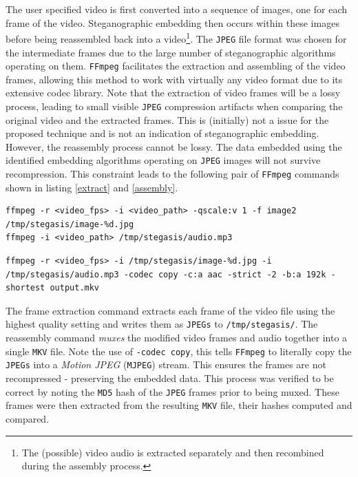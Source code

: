 \documentclass[paper=a4, fontsize=11pt,twoside]{scrartcl}
\numberwithin{table}{section}
\numberwithin{figure}{section}
\numberwithin{algorithm}{section}
\begin{document}
The user specified video is first converted into a sequence of images, one for each frame of the video. Steganographic embedding then occurs within these images before being reassembled back into a video\footnote{The (possible) video audio is extracted separately and then recombined during the assembly process.}. The \texttt{JPEG} file format was chosen for the intermediate frames due to the large number of steganographic algorithms operating on them. \texttt{FFmpeg} facilitates the extraction and assembling of the video frames, allowing this method to work with virtually any video format due to its extensive codec library. Note that the extraction of video frames will be a lossy process, leading to small visible \texttt{JPEG} compression artifacts when comparing the original video and the extracted frames. This is (initially) not a issue for the proposed technique and is not an indication of steganographic embedding. However, the reassembly process cannot be lossy. The data embedded using the identified embedding algorithms operating on \texttt{JPEG} images will not survive recompression. This constraint leads to the following pair of \texttt{FFmpeg} commands shown in listing \ref{extract} and \ref{assembly}.


\begin{lstlisting}[caption={\texttt{FFmpeg} frame extraction command.}, frame=single, label=extract,upquote=true]
ffmpeg -r <video_fps> -i <video_path> -qscale:v 1 -f image2 /tmp/stegasis/image-%d.jpg
ffmpeg -i <video_path> /tmp/stegasis/audio.mp3
\end{lstlisting}

\begin{lstlisting}[caption={\texttt{FFmpeg} video reassembly command.}, frame=single, label=assembly,upquote=true]
ffmpeg -r <video_fps> -i /tmp/stegasis/image-%d.jpg -i /tmp/stegasis/audio.mp3 -codec copy -c:a aac -strict -2 -b:a 192k -shortest output.mkv
\end{lstlisting}

The frame extraction command extracts each frame of the video file using the highest quality setting and writes them as \texttt{JPEGs} to \texttt{/tmp/stegasis/}. The reassembly command \textit{muxes} the modified video frames and audio together into a single \texttt{MKV} file. Note the use of \texttt{-codec copy}, this tells \texttt{FFmpeg} to literally copy the \texttt{JPEGs} into a \textit{Motion JPEG} (\texttt{MJPEG}) stream. This ensures the frames are not recompressed - preserving the embedded data. This process was verified to be correct by noting the \texttt{MD5} hash of the \texttt{JPEG} frames prior to being muxed. These frames were then extracted from the resulting \texttt{MKV} file, their hashes computed and compared.
\end{document}
